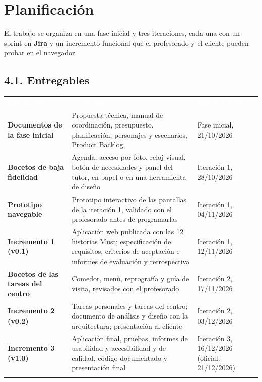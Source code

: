 \documentclass[11pt,a4paper]{article}
\newcommand{\hl}[1]{\textcolor{gblue}{\textbf{#1}}}
\begin{document}
\section{Planificación}
El trabajo se organiza en una fase inicial y tres iteraciones, cada una con un sprint en \hl{Jira} y un incremento funcional que el profesorado y el cliente pueden probar en el navegador.

\subsection*{4.1. Entregables}
{\small\par\noindent\begin{tabular}{@{}>{\raggedright\arraybackslash}p{}>{\raggedright\arraybackslash}p{}>{\raggedright\arraybackslash}p{}@{}}
\rowcolor{gblue}\textcolor{white}{\textbf{Entregable}} & \textcolor{white}{\textbf{Contenido}} & \textcolor{white}{\textbf{Etapa y fecha}} \\
\hl{Documentos de la fase inicial} & Propuesta técnica, manual de coordinación, presupuesto, planificación, personajes y escenarios, Product Backlog & Fase inicial, 21/10/2026 \\ \arrayrulecolor{gline}\hline
\rowcolor{glight}
\hl{Bocetos de baja fidelidad} & Agenda, acceso por foto, reloj visual, botón de necesidades y panel del tutor, en papel o en una herramienta de diseño & Iteración 1, 28/10/2026 \\ \arrayrulecolor{gline}\hline
\hl{Prototipo navegable} & Prototipo interactivo de las pantallas de la iteración 1, validado con el profesorado antes de programarlas & Iteración 1, 04/11/2026 \\ \arrayrulecolor{gline}\hline
\rowcolor{glight}
\hl{Incremento 1 (v0.1)} & Aplicación web publicada con las 12 historias Must; especificación de requisitos, criterios de aceptación e informes de evaluación y retrospectiva & Iteración 1, 12/11/2026 \\ \arrayrulecolor{gline}\hline
\hl{Bocetos de las tareas del centro} & Comedor, menú, reprografía y guía de visita, revisados con el profesorado & Iteración 2, 17/11/2026 \\ \arrayrulecolor{gline}\hline
\rowcolor{glight}
\hl{Incremento 2 (v0.2)} & Tareas personales y tareas del centro; documento de análisis y diseño con la arquitectura; presentación al cliente & Iteración 2, 03/12/2026 \\ \arrayrulecolor{gline}\hline
\hl{Incremento 3 (v1.0)} & Aplicación final, pruebas, informes de usabilidad y accesibilidad y de calidad, código documentado y presentación final & Iteración 3, 16/12/2026 (oficial: 21/12/2026) \\ \arrayrulecolor{gline}\hline
\end{tabular}\par}\medskip
\end{document}
